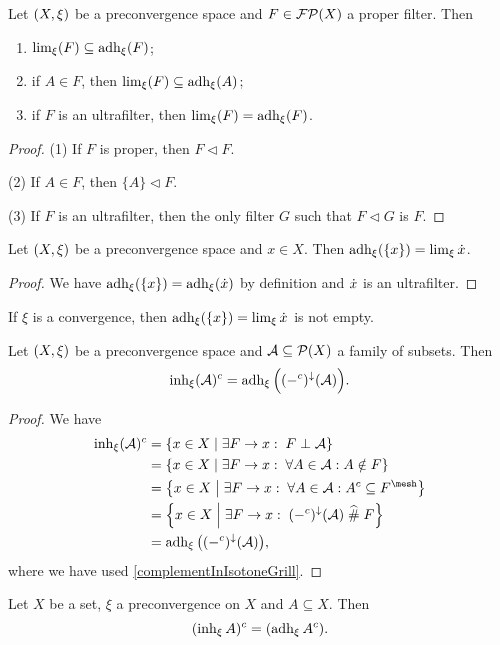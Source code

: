\begin{lemma} \label{adherenceLimitFilter}
Let $\left( X,\xi \right)$ be a preconvergence space and $F\in \operatorname{\mathcal{FP}}(X)$ a proper filter. Then
\begin{enumerate}
\item $\lim_\xi(F) \subseteq \operatorname{adh}_\xi(F)$;
\item if $A\in F$, then $\lim_\xi(F)\subseteq \operatorname{adh}_\xi(A)$;
\item if $F$ is an ultrafilter, then $\lim_\xi(F) = \operatorname{adh}_\xi(F)$.
\end{enumerate}
\end{lemma}
\begin{proof}
(1) If $F$ is proper, then $F\lhd F$.

(2) If $A\in F$, then $\{A\}\lhd F$.

(3) If $F$ is an ultrafilter, then the only filter $G$ such that $F\lhd G$ is $F$.
\end{proof}
\begin{corollary} \label{singletonAdherence}
Let $\left( X,\xi \right)$ be a preconvergence space and $x\in X$. Then $\operatorname{adh}_\xi(\{x\}) = \lim_\xi \dot{x}$.
\end{corollary}
\begin{proof}
We have $\operatorname{adh}_\xi(\{x\}) = \operatorname{adh}_\xi(\dot{x})$ by definition and $\dot{x}$ is an ultrafilter.
\end{proof}
If $\xi$ is a convergence, then $\operatorname{adh}_\xi(\{x\}) = \lim_\xi \dot{x}$ is not empty.

\begin{proposition} \label{inherenceComplementAdherence}
Let $\left( X,\xi \right)$ be a preconvergence space and $\mathcal{A}\subseteq \operatorname{\mathcal{P}}(X)$ a family of subsets. Then
\[ \operatorname{inh}_\xi(\mathcal{A})^c = \operatorname{adh}_\xi\Big((-^c)^{\downarrow}(\mathcal{A})\Big). \]
\end{proposition}
\begin{proof}
We have
\begin{align*}
\inh_\xi(\mathcal{A})^c &= \setbuilder{x\in X}{\exists F\to x: \; F\perp\mathcal{A}} \\
&= \setbuilder{x\in X}{\exists F\to x: \;\forall A\in\mathcal{A}: A\notin F} \\
&= \setbuilder{x\in X}{\exists F\to x: \; \forall A\in\mathcal{A}: A^c\subseteq F^\mesh} \\
&= \setbuilder{x\in X}{\exists F\to x: \; (-^c)^{\imf}(\mathcal{A}) \amesh F} \\
&= \adh_\xi\big((-^c)^{\imf}(\mathcal{A})\big),
\end{align*}
where we have used \ref{complementInIsotoneGrill}.
\end{proof}
\begin{corollary} \label{principalInherenceComplementAdherence}
Let $X$ be a set, $\xi$ a preconvergence on $X$ and $A \subseteq X$. Then
\[ (\operatorname{inh}_\xi A)^c = (\operatorname{adh}_\xi A^c). \]
\end{corollary}

